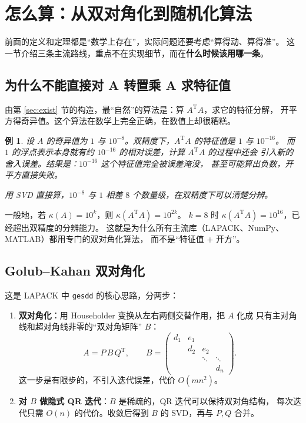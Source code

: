 \documentclass[UTF8, 11pt, a4paper, fontset=windows]{ctexart}
\theoremstyle{cnthm}
\theoremstyle{cndef}
\newtheorem{exam}[defn]{例}
\newcommand{\T}{^{\mathrm{T}}}
\begin{document}
\section{怎么算：从双对角化到随机化算法}\label{sec:compute}

前面的定义和定理都是“数学上存在”，实际问题还要考虑“算得动、算得准”。
这一节介绍三条主流路线，重点不在实现细节，而在\textbf{什么时候该用哪一条}。

\subsection{为什么不能直接对 A 转置乘 A 求特征值}

由第 \ref{sec:exist} 节的构造，最“自然”的算法是：算 $A\T A$，求它的特征分解，
开平方得奇异值。这个算法在数学上完全正确，在数值上却很糟糕。

\begin{exam}
设 $A$ 的奇异值为 $1$ 与 $10^{-8}$。双精度下，$A\T A$ 的特征值是 $1$ 与 $10^{-16}$。
而 $1$ 的浮点表示本身就有约 $10^{-16}$ 的相对误差，计算 $A\T A$ 的过程中还会
引入新的舍入误差。结果是：$10^{-16}$ 这个特征值完全被误差淹没，
甚至可能算出负数，开平方直接失败。

用 SVD 直接算，$10^{-8}$ 与 $1$ 相差 $8$ 个数量级，在双精度下可以清楚分辨。
\end{exam}

一般地，若 $\kappa(A)=10^{k}$，则 $\kappa(A\T A)=10^{2k}$。
$k=8$ 时 $\kappa(A\T A)=10^{16}$，已经超出双精度的分辨能力。
这就是为什么所有主流库（LAPACK、NumPy、MATLAB）都用专门的双对角化算法，
而不是“特征值 + 开方”。

\subsection{Golub--Kahan 双对角化}

这是 LAPACK 中 \texttt{gesdd} 的核心思路，分两步：

\begin{enumerate}
  \item \textbf{双对角化}：用 Householder 变换从左右两侧交替作用，把 $A$ 化成
        只有主对角线和超对角线非零的“双对角矩阵” $B$：
        \begin{equation}
          A=P\,B\,Q\T,\qquad
          B=\begin{pmatrix}
          d_1&e_1&&\\
          &d_2&e_2&\\
          &&\ddots&\ddots\\
          &&&d_n
          \end{pmatrix}.
        \end{equation}
        这一步是有限步的，不引入迭代误差，代价 $O(mn^2)$。
  \item \textbf{对 $B$ 做隐式 QR 迭代}：$B$ 是稀疏的，QR 迭代可以保持双对角结构，
        每次迭代只需 $O(n)$ 的代价。收敛后得到 $B$ 的 SVD，再与 $P,Q$ 合并。
\end{enumerate}
\end{document}
